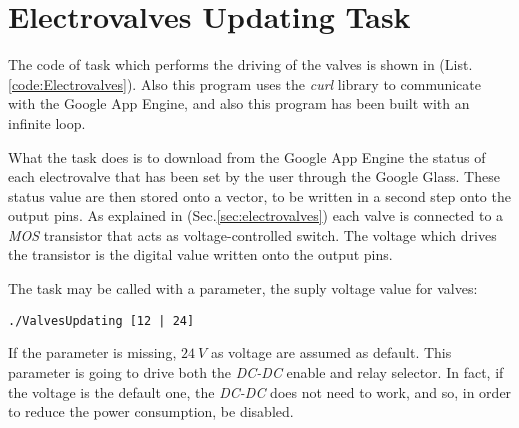 \section{Electrovalves Updating Task}\label{sec:valves}

The code of task which performs the driving of the valves is shown in (List.\ref{code:Electrovalves}). Also this program uses the \textit{curl} library to communicate with the Google App Engine, and also this program has been built with an infinite loop.

What the task does is to download from the Google App Engine the status of each electrovalve that has been set by the user through the Google Glass. These status value are then stored onto a vector, to be written in a second step onto the output pins. As explained in (Sec.\ref{sec:electrovalves}) each valve is connected to a \textit{MOS} transistor that acts as voltage-controlled switch. The voltage which drives the transistor is the digital value written onto the output pins.

The task may be called with a parameter, the suply voltage value for valves:
\begin{verbatim}
./ValvesUpdating [12 | 24]
\end{verbatim}
If the parameter is missing, $24\ V$ as voltage are assumed as default. This parameter is going to drive both the \textit{DC-DC} enable and relay selector. In fact, if the voltage is the default one, the \textit{DC-DC} does not need to work, and so, in order to reduce the power consumption, be disabled.
\cleardoublepage